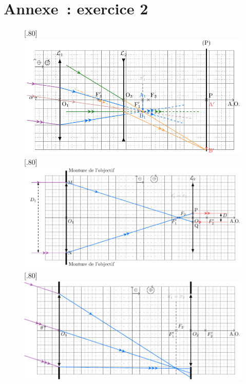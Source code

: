 \documentclass[a4paper, 10pt, garamond, oneside]{book}
\begin{document}
{}{
	\newpage
	\chapter*{Annexe~: exercice 2}
	\begin{figure}[htbp!]
		\centering
		[.80\linewidth]
		{\includegraphics[width=\linewidth]{teleobj}}
		[.80\linewidth]
		{\includegraphics[width=\linewidth]{lunette2_corr}}
		[.80\linewidth]
		{\includegraphics[width=\linewidth]{lunette3_corr}}
		\caption{}
		\label{fig:lunettes}
	\end{figure}

}
\end{document}
